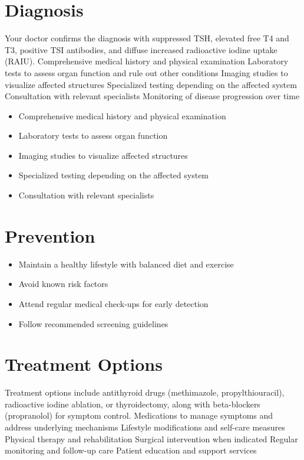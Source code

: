 \section{Diagnosis}
Your doctor confirms the diagnosis with suppressed TSH, elevated free T4 and T3, positive TSI antibodies, and diffuse increased radioactive iodine uptake (RAIU). Comprehensive medical history and physical examination Laboratory tests to assess organ function and rule out other conditions Imaging studies to visualize affected structures Specialized testing depending on the affected system Consultation with relevant specialists Monitoring of disease progression over time

\begin{itemize}[noitemsep]
  \item Comprehensive medical history and physical examination
  \item Laboratory tests to assess organ function
  \item Imaging studies to visualize affected structures
  \item Specialized testing depending on the affected system
  \item Consultation with relevant specialists
\end{itemize}
\section{Prevention}
\begin{itemize}[noitemsep]
  \item Maintain a healthy lifestyle with balanced diet and exercise
  \item Avoid known risk factors
  \item Attend regular medical check-ups for early detection
  \item Follow recommended screening guidelines
\end{itemize}
\section{Treatment Options}
Treatment options include antithyroid drugs (methimazole, propylthiouracil), radioactive iodine ablation, or thyroidectomy, along with beta-blockers (propranolol) for symptom control. Medications to manage symptoms and address underlying mechanisms Lifestyle modifications and self-care measures Physical therapy and rehabilitation Surgical intervention when indicated Regular monitoring and follow-up care Patient education and support services

